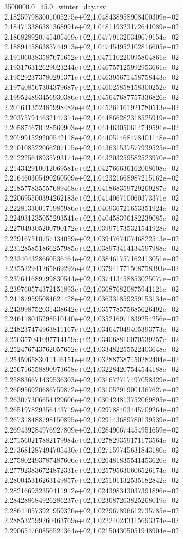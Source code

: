 \begin{filecontents*}{3500000.0_45.0_winter_day.csv}
2.182597983001005275e+02,1.048438958908400309e+02
2.184713386381368991e+02,1.048119323172641089e+02
2.186828920745405469e+02,1.047791320349679154e+02
2.188944586385744913e+02,1.047454952102816605e+02
2.191060383587671652e+02,1.047110220095864861e+02
2.193176312629023244e+02,1.046757125992953661e+02
2.195292373780291371e+02,1.046395671458758443e+02
2.197408567304379687e+02,1.046025858158300252e+02
2.199524893456930386e+02,1.045647687757336826e+02
2.201641352485998482e+02,1.045261161921780513e+02
2.203757944632147314e+02,1.044866282318525919e+02
2.205874670128569903e+02,1.044463050614749591e+02
2.207991529200542118e+02,1.044051468478401148e+02
2.210108522066207115e+02,1.043631537577939525e+02
2.212225648935793174e+02,1.043203259582523970e+02
2.214342910012069581e+02,1.042766636162068608e+02
2.216460305490260509e+02,1.042321668987215162e+02
2.218577835557689468e+02,1.041868359729269287e+02
2.220695500394262183e+02,1.041406710060373371e+02
2.222813300171985986e+02,1.040936721653351924e+02
2.224931235055293541e+02,1.040458396182239085e+02
2.227049305200790172e+02,1.039971735321541928e+02
2.229167510757434059e+02,1.039476740746822543e+02
2.231285851866257985e+02,1.038973414134597988e+02
2.233404328660536464e+02,1.038461757162413051e+02
2.235522941265869292e+02,1.037941771508758393e+02
2.237641689799830544e+02,1.037413458853025077e+02
2.239760574372151893e+02,1.036876820875941121e+02
2.241879595084621428e+02,1.036331859259153134e+02
2.243998752031438642e+02,1.035778575685626492e+02
2.246118045298510140e+02,1.035216971839254256e+02
2.248237474963811167e+02,1.034647049405393773e+02
2.250357041097714159e+02,1.034068810070539257e+02
2.252476743762057652e+02,1.033482255522403648e+02
2.254596583011146151e+02,1.032887387450282404e+02
2.256716558890973658e+02,1.032284207544544188e+02
2.258836671439536303e+02,1.031672717497058329e+02
2.260956920686759872e+02,1.031052919001367627e+02
2.263077306654429606e+02,1.030424813752069895e+02
2.265197829356443719e+02,1.029788403445709264e+02
2.267318488798150895e+02,1.029143689780139539e+02
2.269439284976927809e+02,1.028490674454951659e+02
2.271560217882179984e+02,1.027829359171173564e+02
2.273681287494705430e+02,1.027159745631843180e+02
2.275802493787487606e+02,1.026481835541453620e+02
2.277923836724872331e+02,1.025795630606526174e+02
2.280045316263149857e+02,1.025101132535182842e+02
2.282166932350411912e+02,1.024398343037391896e+02
2.284288684926286237e+02,1.023687263825268019e+02
2.286410573921959326e+02,1.022967896612735785e+02
2.288532599260463769e+02,1.022240243115693374e+02
2.290654760856521364e+02,1.021504305051948904e+02

\end{filecontents*}
